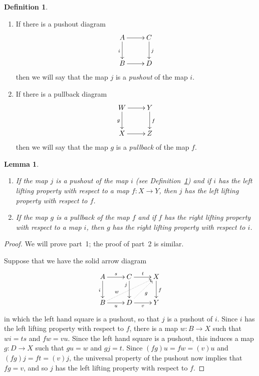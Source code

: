 \documentclass{amsart}
\numberwithin{equation}{section}
\theoremstyle{slplain}
\newtheorem{lem}[equation]{Lemma}
\theoremstyle{definition}
\newtheorem{defn}[equation]{Definition} %
\theoremstyle{remark}
\newcommand{\defref}{Definition~\ref}
\begin{document}
\begin{defn}
  \label{def:pushout}
  \leavevmode
  \begin{enumerate}
  \item If there is a pushout diagram
    \begin{displaymath}
      \xymatrix{
        {A} \ar[r] \ar[d]_{i}
        & {C} \ar[d]^{j}\\
        {B} \ar[r]
        & {D}
      }
    \end{displaymath}
    then we will say that the map $j$ is a \emph{pushout} of the map
    $i$.
  \item If there is a pullback diagram
    \begin{displaymath}
      \xymatrix{
        {W} \ar[r] \ar[d]_{g}
        & {Y} \ar[d]^{f}\\
        {X} \ar[r]
        & {Z}
      }
    \end{displaymath}
    then we will say that the map $g$ is a \emph{pullback} of the map
    $f$.
  \end{enumerate}
\end{defn}

\begin{lem}
  \label{lem:pushLLP}
  \leavevmode
  \begin{enumerate}
  \item If the map $j$ is a pushout of the map $i$ (see
    \defref{def:pushout}) and if $i$ has the left lifting property
    with respect to a map $f\colon X \to Y$, then $j$ has the left
    lifting property with respect to $f$.
  \item If the map $g$ is a pullback of the map $f$ and if $f$ has the
    right lifting property with respect to a map $i$, then $g$ has the
    right lifting property with respect to $i$.
  \end{enumerate}
\end{lem}

\begin{proof}
  We will prove part~1; the proof of part~2 is similar.

  Suppose that we have the solid arrow diagram
  \begin{displaymath}
    \xymatrix{
      {A} \ar[r]^{s} \ar[d]_{i}
      & {C} \ar[r]^{t} \ar[d]_(.3){j}
      & {X} \ar[d]^{f}\\
      {B} \ar[r]_{u} \ar@{..>}[urr]^(.3){w}
      & {D} \ar[r]_{v} \ar@{..>}[ur]_{g}
      & {Y}
    }
  \end{displaymath}
  in which the left hand square is a pushout, so that $j$ is a pushout
  of $i$.  Since $i$ has the left lifting property with respect to
  $f$, there is a map $w\colon B \to X$ such that $wi = ts$ and $fw =
  vu$.  Since the left hand square is a pushout, this induces a map
  $g\colon D \to X$ such that $gu = w$ and $gj = t$.  Since $(fg)u =
  fw = (v)u$ and $(fg)j = ft = (v)j$, the universal property of the
  pushout now implies that $fg = v$, and so $j$ has the left lifting
  property with respect to $f$.
\end{proof}
\end{document}
